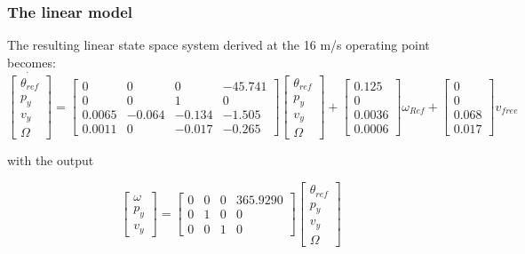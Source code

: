 \subsubsection{The linear model} \label{sec:linear_model_xdot}
The resulting linear state space system derived at the 16 m/s operating point becomes:
\begin{equation}\label{eq:xdot}
	\dot{\begin{bmatrix} \theta_{ref} \\
						p_y \\ 
						v_y \\
						\Omega \end{bmatrix}} = 
	\begin{bmatrix} 0       &  0        & 0 		& -45.741	\\
					0       &  0   		& 1    		& 0			\\
					0.0065  & -0.064	& -0.134	& -1.505	\\
					0.0011  &       0  	& -0.017	& -0.265\end{bmatrix}
	\begin{bmatrix} \theta_{ref} \\
					p_y \\ 
					v_y \\
					\Omega \end{bmatrix} + 
	\begin{bmatrix} 0.125 	\\
					0		\\
					0.0036	\\
					0.0006\end{bmatrix} \omega_{Ref} + 
	\begin{bmatrix} 0	\\
					0		\\
					0.068 	\\
					0.017 \end{bmatrix} v_{free}
\end{equation}

\smallskip
\noindent with the output

\begin{equation}\label{sec:linear_model_y}
	\begin{bmatrix} \omega \\ 
					p_y \\
					v_y \end{bmatrix} = 
	\begin{bmatrix}	0  	& 0 	& 0  	& 365.9290	\\
					0  	& 1  	& 0 	& 0			\\
					0	& 0 	& 1 	& 0 \end{bmatrix}
	\begin{bmatrix} \theta_{ref} \\
					p_y \\ 
					v_y \\
					\Omega \end{bmatrix}
\end{equation}

